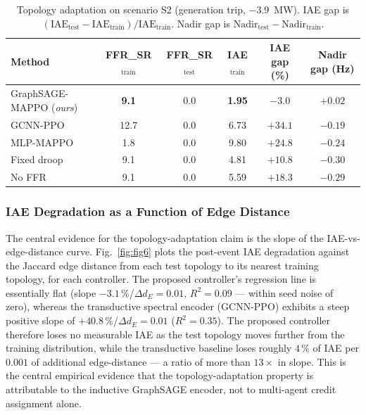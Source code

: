 \begin{table}[!t]
\caption{Topology adaptation on scenario S2 (generation trip,
$-3.9$~MW). IAE gap is
$(\mathrm{IAE}_{\mathrm{test}}-\mathrm{IAE}_{\mathrm{train}})/\mathrm{IAE}_{\mathrm{train}}$.
Nadir gap is $\mathrm{Nadir}_{\mathrm{test}}-\mathrm{Nadir}_{\mathrm{train}}$.}
\label{tab:topo}
\centering
\footnotesize
\begin{tabular}{lccccc}
\toprule
Method & FFR\_SR$_{\mathrm{train}}$ & FFR\_SR$_{\mathrm{test}}$ &
IAE$_{\mathrm{train}}$ & IAE gap (\%) & Nadir gap (Hz) \\
\midrule
GraphSAGE-MAPPO (\emph{ours}) & \textbf{9.1} & 0.0 & \textbf{1.95} & $\mathbf{-3.0}$ & $\mathbf{+0.02}$ \\
GCNN-PPO~\cite{guo2024gcnnppo} & 12.7        & 0.0 & 6.73          & $+34.1$         & $-0.19$          \\
MLP-MAPPO                     & 1.8          & 0.0 & 9.80          & $+24.8$         & $-0.24$          \\
Fixed droop                   & 9.1          & 0.0 & 4.81          & $+10.8$         & $-0.30$          \\
No FFR                        & 9.1          & 0.0 & 5.59          & $+18.3$         & $-0.29$          \\
\bottomrule
\end{tabular}
\end{table}

\subsubsection*{IAE Degradation as a Function of Edge Distance}
The central evidence for the topology-adaptation claim is the slope
of the IAE-vs-edge-distance curve. Fig.~\ref{fig:fig6} plots the
post-event IAE degradation against the Jaccard edge distance from
each test topology to its nearest training topology, for each
controller. The proposed controller's regression line is essentially
flat (slope $-3.1$\,\%/$\Delta d_E\!=\!0.01$, $R^{2}=0.09$ ---
within seed noise of zero), whereas the transductive spectral
encoder (GCNN-PPO) exhibits a steep positive slope of
$+40.8$\,\%/$\Delta d_E\!=\!0.01$ ($R^{2}=0.35$). The proposed
controller therefore loses no measurable IAE as the test topology
moves further from the training distribution, while the transductive
baseline loses roughly $4$\,\% of IAE per $0.001$ of additional
edge-distance --- a ratio of more than $13\times$ in slope.
This is the central empirical evidence that the topology-adaptation
property is attributable to the inductive GraphSAGE encoder, not to
multi-agent credit assignment alone.

